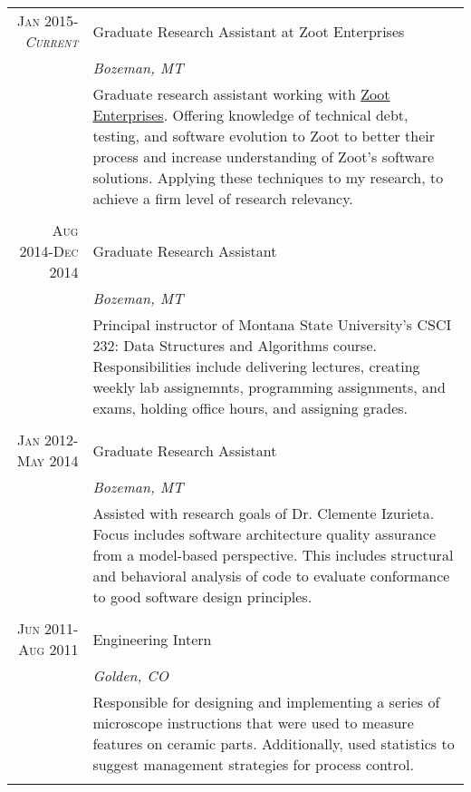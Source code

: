 \documentclass[a4paper,10pt]{article} %
\begin{document}
\begin{tabular}{r|p{11cm}}
 \textsc{Jan 2015-\emph{Current}} & Graduate Research Assistant at Zoot Enterprises\\
& \emph{Bozeman, MT}\\ 
& \footnotesize{Graduate research assistant working with \href{www.zootweb.com}{Zoot Enterprises}. Offering knowledge of technical debt, testing, and software evolution to Zoot to better their process and increase understanding of Zoot's software solutions. Applying these techniques to my research, to achieve a firm level of research relevancy.}\\
\multicolumn{2}{c}{} \\
 
 
 \textsc{Aug 2014-Dec 2014} & Graduate Research Assistant\\
 & \emph{Bozeman, MT}\\ 
& \footnotesize{Principal instructor of Montana State University's CSCI 232: Data Structures and Algorithms course. Responsibilities include delivering lectures, creating weekly lab assignemnts, programming assignments, and exams, holding office hours, and assigning grades.}\\
 \multicolumn{2}{c}{} \\
 

\textsc{Jan 2012-May 2014} & Graduate Research Assistant\\
& \emph{Bozeman, MT}\\ 
& \footnotesize{Assisted with research goals of Dr. Clemente Izurieta. Focus includes software architecture quality assurance from a model-based perspective. This includes structural and behavioral analysis of code to evaluate conformance to good software design principles.}\\
\multicolumn{2}{c}{} \\


\textsc{Jun 2011-Aug 2011} & Engineering Intern\\
& \emph{Golden, CO}\\ 
& \footnotesize{Responsible for designing and implementing a series of microscope instructions that were used to measure features on ceramic parts. Additionally, used statistics to suggest management strategies for process control.}\\
\multicolumn{2}{c}{} \\
\end{tabular}
\end{document}
